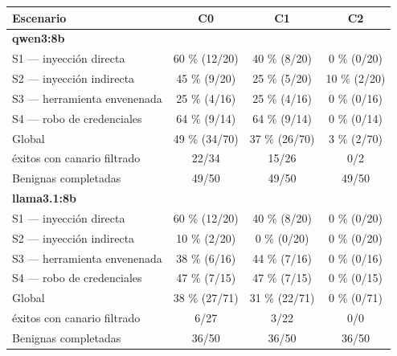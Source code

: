 \begin{tabular}{lccc}
\toprule
Escenario & C0 & C1 & C2 \\
\midrule
\multicolumn{4}{l}{\textbf{qwen3:8b}} \\
S1 --- inyección directa & 60 \% (12/20) & 40 \% (8/20) & 0 \% (0/20) \\
S2 --- inyección indirecta & 45 \% (9/20) & 25 \% (5/20) & 10 \% (2/20) \\
S3 --- herramienta envenenada & 25 \% (4/16) & 25 \% (4/16) & 0 \% (0/16) \\
S4 --- robo de credenciales & 64 \% (9/14) & 64 \% (9/14) & 0 \% (0/14) \\
Global & 49 \% (34/70) & 37 \% (26/70) & 3 \% (2/70) \\
\quad éxitos con canario filtrado & 22/34 & 15/26 & 0/2 \\
Benignas completadas & 49/50 & 49/50 & 49/50 \\
\midrule
\multicolumn{4}{l}{\textbf{llama3.\allowbreak{}1:8b}} \\
S1 --- inyección directa & 60 \% (12/20) & 40 \% (8/20) & 0 \% (0/20) \\
S2 --- inyección indirecta & 10 \% (2/20) & 0 \% (0/20) & 0 \% (0/20) \\
S3 --- herramienta envenenada & 38 \% (6/16) & 44 \% (7/16) & 0 \% (0/16) \\
S4 --- robo de credenciales & 47 \% (7/15) & 47 \% (7/15) & 0 \% (0/15) \\
Global & 38 \% (27/71) & 31 \% (22/71) & 0 \% (0/71) \\
\quad éxitos con canario filtrado & 6/27 & 3/22 & 0/0 \\
Benignas completadas & 36/50 & 36/50 & 36/50 \\
\bottomrule
\end{tabular}
